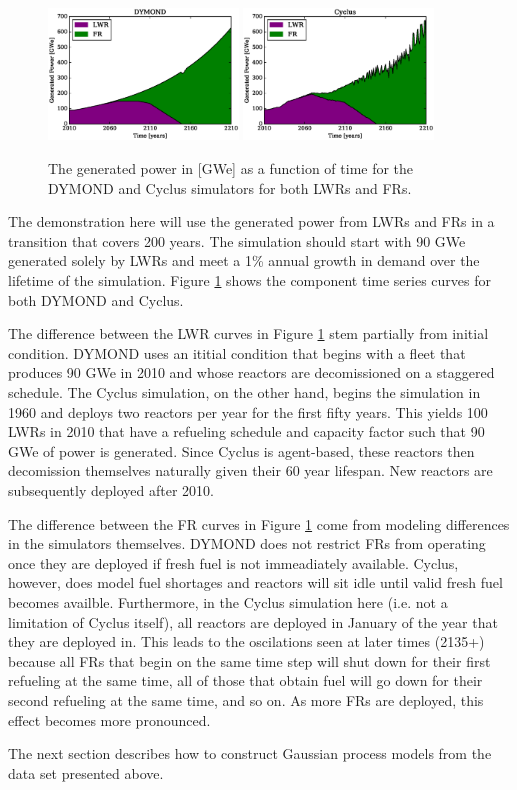 \begin{figure}[htb]
\centering
\includegraphics[width=0.45\textwidth]{gwe-dymond.eps}
\includegraphics[width=0.45\textwidth]{gwe-cyclus.eps}
\caption{The generated power in [GWe] as a function of time for the DYMOND and 
Cyclus simulators for both LWRs and FRs.}
\label{gwe-simulators}
\end{figure}

The demonstration here will use the generated power from LWRs and FRs in 
a transition that covers 200 years. The simulation should start with
90 GWe generated solely by LWRs and meet a 1\% annual growth in demand over the 
lifetime of the simulation. Figure \ref{gwe-simulators} shows the component time 
series curves for both DYMOND and Cyclus. 

The difference between the LWR curves in Figure \ref{gwe-simulators} stem 
partially from initial condition. DYMOND uses an ititial condition that 
begins with a fleet that produces 90 GWe in 2010 and whose reactors are 
decomissioned on a staggered schedule. The Cyclus simulation, on the other 
hand, begins the simulation in 1960 and deploys two reactors per year for
the first fifty years. This yields 100 LWRs in 2010 that have a refueling 
schedule and capacity factor such that 90 GWe of power is generated. Since
Cyclus is agent-based, these reactors then decomission themselves naturally
given their 60 year lifespan. New reactors are subsequently deployed after
2010.

The difference between the FR curves in Figure \ref{gwe-simulators} come
from modeling differences in the simulators themselves. DYMOND does not 
restrict FRs from operating once they are deployed if fresh fuel is not 
immeadiately available. Cyclus, however, does model fuel shortages and 
reactors will sit idle until valid fresh fuel becomes availble. Furthermore, 
in the Cyclus simulation here (i.e. not a limitation of Cyclus itself), 
all reactors are deployed in January of the year that they are deployed in.
This leads to the oscilations seen at later times (2135+) because all 
FRs that begin on the same time step will shut down for their first
refueling at the same time, all of those that obtain fuel will go down for 
their second refueling at the same time, and so on. As more FRs are deployed, 
this effect becomes more pronounced.

The next section describes how to
construct Gaussian process models from the data set presented above.

\clearpage

